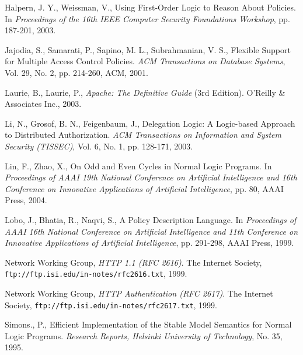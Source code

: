 \documentclass[global,twocolumn,final]{svjour}
\begin{document}
\begin{thebibliography}{5}
      Halpern, J. Y., Weissman, V.,
      Using First-Order Logic to Reason About Policies.
      In {\em Proceedings of the 16th IEEE Computer Security Foundations
      Workshop}, pp. 187-201, 2003.

      Jajodia, S., Samarati, P., Sapino, M. L., Subrahmanian, V. S.,
      Flexible Support for Multiple Access Control Policies.
      {\em ACM Transactions on Database Systems},
      Vol. 29, No. 2, pp. 214-260, ACM, 2001.

      Laurie, B., Laurie, P.,
      {\em Apache: The Definitive Guide} (3rd Edition).
      O'Reilly \& Associates Inc., 2003.

      Li, N., Grosof, B. N., Feigenbaum, J.,
      Delegation Logic: A Logic-based Approach to Distributed Authorization.
      {\em ACM Transactions on Information and System Security (TISSEC)},
      Vol. 6, No. 1, pp. 128-171, 2003.

      Lin, F., Zhao, X.,
      On Odd and Even Cycles in Normal Logic Programs.
      In {\em Proceedings of AAAI 19th National Conference on Artificial
      Intelligence and 16th Conference on Innovative Applications of Artificial
      Intelligence},
      pp. 80, AAAI Press, 2004.

      Lobo, J., Bhatia, R., Naqvi, S.,
      A Policy Description Language.
      In {\em Proceedings of AAAI 16th National Conference on Artificial
      Intelligence and 11th Conference on Innovative Applications of Artificial
      Intelligence},
      pp. 291-298, AAAI Press, 1999.

      Network Working Group,
      {\em HTTP 1.1 (RFC 2616)}.
      The Internet Society,
      {\tt \scriptsize ftp://ftp.isi.edu/in-notes/rfc2616.txt},
      1999.

      Network Working Group,
      {\em HTTP Authentication (RFC 2617)}.
      The Internet Society,
      {\tt \scriptsize ftp://ftp.isi.edu/in-notes/rfc2617.txt},
      1999.

      Simons., P.,
      Efficient Implementation of the Stable Model Semantics for Normal Logic
      Programs.
      {\em Research Reports, Helsinki University of Technology},
      No. 35, 1995.
  \end{thebibliography}
\end{document}
